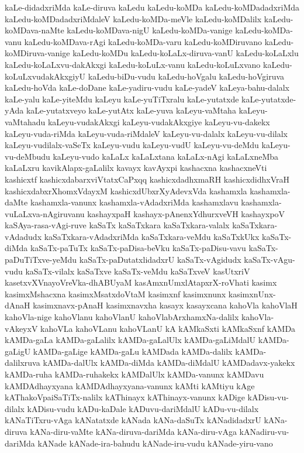 {kaLe-didadxriMda
kaLe-diruva
kaLedu
kaLedu-koMDa
kaLedu-koMDadadxriMda
kaLedu-koMDadadxriMdaleV
kaLedu-koMDa-meVle
kaLedu-koMDalilx
kaLedu-koMDava-naMte
kaLedu-koMDava-nigU
kaLedu-koMDa-vanige
kaLedu-koMDa-vanu
kaLedu-koMDava-rAgi
kaLedu-koMDa-varu
kaLedu-koMDiruvano
kaLedu-koMDiruva-vanige
kaLedu-koMDu
kaLedu-koLaLx-diruva-vanU
kaLedu-koLaLxlu
kaLedu-koLaLxvu-dakAkxgi
kaLedu-koLuLx-vanu
kaLedu-koLuLxvano
kaLedu-koLuLxvudakAkxgiyU
kaLedu-biDu-vudu
kaLedu-hoVgalu
kaLedu-hoVgiruva
kaLedu-hoVda
kaLe-doDane
kaLe-yadiru-vudu
kaLe-yadeV
kaLeya-bahu-dalalx
kaLe-yalu
kaLe-yiteMdu
kaLeyu
kaLe-yuTiTxralu
kaLe-yutatxde
kaLe-yutatxde-yAda
kaLe-yutatxveyo
kaLe-yutAtx
kaLe-yuva
kaLeyu-vaMtaha
kaLeyu-vaMtahadu
kaLeyu-vudakAkxgi
kaLeyu-vudakAkxgiye
kaLeyu-vu-dakekx
kaLeyu-vuda-riMda
kaLeyu-vuda-riMdaleV
kaLeyu-vu-dalalx
kaLeyu-vu-dilalx
kaLeyu-vudilalx-vaSeTx
kaLeyu-vudu
kaLeyu-vudU
kaLeyu-vu-deMdu
kaLeyu-vu-deMbudu
kaLeyu-vudo
kaLaLx
kaLaLxtana
kaLaLx-nAgi
kaLaLxneMba
kaLaLxru
kavikAlapx-gaLalilx
kavayx
kavAyxpi
kashacxna
kashacxneVti
kashicxtf
kashicxdabarxviVtatxCaPxqq
kashicxdadhxmaRH
kashicxdidhxVraH
kashicxdabxrXhomxVdayxM
kashicxdUbxrXyAdevxVda
kashamxla
kashamxla-daMte
kashamxla-vanunx
kashamxla-vAdadxriMda
kashamxlavu
kashamxla-vuLaLxva-nAgiruvanu
kashayxpaH
kashayx-pAnenxYdhurxveVH
kashayxpoV
kaSAya-rasa-vAgi-ruve
kaSaTx
kaSaTxkara
kaSaTxkara-valalx
kaSaTxkara-vAdadudx
kaSaTxkara-vAdadxriMda
kaSaTxkara-veMdu
kaSaTxkUkx
kaSaTx-diMda
kaSaTx-paTuTx
kaSaTx-paDisa-beVku
kaSaTx-paDisu-vavu
kaSaTx-paDuTiTxve-yeMdu
kaSaTx-paDutatxlidadxrU
kaSaTx-vAgidudx
kaSaTx-vAgu-vudu
kaSaTx-vilalx
kaSaTxve
kaSaTx-veMdu
kaSaTxveV
kasUtxriV
kasetxvXVnayoVreVka-dhABUyaM
kasAmxnUmxlAtapxrX-roVhati
kasimx
kasimxMshacxna
kasimxMsatxdoVtaM
kasimxnf
kasimxnunx
kasimxnUnx-dAnaH
kasimxnavx-pAnaH
kasimxnavxha
kasayx
kasayxcana
kahoVla
kahoVlaH
kahoVla-nige
kahoVlanu
kahoVlanU
kahoVlabArxhamxNa-dalilx
kahoVla-vAkeyxV
kahoVLa
kahoVLanu
kahoVLanU
kA
kAMkaSxti
kAMkaSxnf
kAMDa
kAMDa-gaLa
kAMDa-gaLalilx
kAMDa-gaLalUlx
kAMDa-gaLiMdalU
kAMDa-gaLigU
kAMDa-gaLige
kAMDa-gaLu
kAMDada
kAMDa-dalilx
kAMDa-dalilxruva
kAMDa-dalUlx
kAMDa-diMda
kAMDa-diMdalU
kAMDadavx-yakekx
kAMDa-ruha
kAMDa-ruhakekx
kAMDalUlx
kAMDa-vanunx
kAMDavu
kAMDAdhayxyana
kAMDAdhayxyana-vanunx
kAMti
kAMtiyu
kAge
kAThakoVpaiSaTiTx-nalilx
kAThinayx
kAThinayx-vanunx
kADige
kADisu-vu-dilalx
kADisu-vudu
kADu-kaDale
kADuvu-dariMdalU
kADu-vu-dilalx
kANaTiTxru-vAga
kANatatxde
kANada
kANa-daSuTx
kANadidadxrU
kANa-diruva
kANa-diru-vaMte
kANa-diruva-dariMda
kANa-diru-vAga
kANadiru-vu-dariMda
kANade
kANade-ira-bahudu
kANade-iru-vudu
kANade-yiru-vano
}
